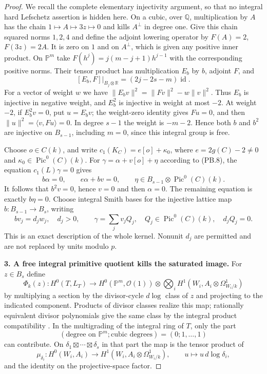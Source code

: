 \begin{proof}
We recall the complete elementary injectivity argument, so that no
integral hard Lefschetz assertion is hidden here. On a cubic, over
$\mathbb Q$, multiplication by $A$ has the chain
$1\mapsto A\mapsto3z\mapsto0$ and kills $A^\perp$ in degree one.
Give this chain squared norms $1,2,4$ and define the adjoint lowering
operator by $F(A)=2$, $F(3z)=2A$. It is zero on $1$ and on $A^\perp$,
which is given any positive inner product. On $\mathbb P^m$ take
$F(h^j)=j(m-j+1)h^{j-1}$ with the corresponding positive norms.
Their tensor product has multiplication $E_b$ by $b$, adjoint $F$,
and
\[
 [E_b,F]|_{B_j\otimes\mathbb R}
       =(2j-2s-m)\operatorname{id}.
\]
For a vector of weight $w$ we have
$\|E_bv\|^2=\|Fv\|^2-w\|v\|^2$.
Thus $E_b$ is injective in negative weight, and $E_b^2$ is injective
in weight at most $-2$. At weight $-2$, if $E_b^2v=0$, put
$u=E_bv$; the weight-zero identity gives $Fu=0$, and then
$\|u\|^2=\langle v,Fu\rangle=0$. In degree $s-1$ the weight is
$-m-2$. Hence both $b$ and $b^2$ are injective on $B_{s-1}$,
including $m=0$, since this integral group is free.

Choose $o\in C(k)$, and write $c_1(K_C)=e[o]+\kappa_0$, where
$e=2g(C)-2\ne0$ and $\kappa_0\in\operatorname{Pic}^0(C)(k)$.
For $\gamma=\alpha+v[o]+\eta$ according to (PB.8), the equation
$c_1(L)\gamma=0$ gives
\[
 b\alpha=0,\qquad e\alpha+bv=0,
 \qquad
 \eta\in B_{s-1}\otimes\operatorname{Pic}^0(C)(k).
\]
It follows that $b^2v=0$, hence $v=0$ and then $\alpha=0$.
The remaining equation is exactly $b\eta=0$.
Choose integral Smith bases for the injective lattice map
$b:B_{s-1}\to B_s$, writing
\[
 bv_j=d_jw_j,\quad d_j>0,
 \qquad
 \gamma=\sum_jv_jQ_j,\quad
 Q_j\in\operatorname{Pic}^0(C)(k),\quad d_jQ_j=0.
 \tag{PB.9}
\]
This is an exact description of the whole kernel. Nonunit $d_j$
are permitted and are not replaced by units modulo $p$.

\textbf{3. A free integral primitive quotient kills the saturated image.}
For $z\in B_s$ define
\[
 \Phi_k(z):H^0(T,L_T)\longrightarrow
 H^0(\mathbb P^m,\mathcal O(1))\otimes
            \bigotimes_i H^1(W_i,A_i\otimes\Omega^1_{W_i/k})
 \tag{PB.10}
\]
by multiplying a section by the divisor-cycle $d\log$ class of $z$
and projecting to the indicated component. Products of divisor
classes realize this map; rationally equivalent divisor polynomials
give the same class by the integral product compatibility
\citep[Section 3, diagram (22), pp.~557--558]{cyBraunling2013}.
In the multigrading of the integral ring of $T$, only the part
\[
       (\text{degree on }\mathbb P^m;\text{cubic degrees})
                         =(0;1,\ldots,1)
 \tag{PB.11}
\]
can contribute. On $\delta_1\boxtimes\cdots\boxtimes\delta_s$
in that part the map is the tensor product of
\[
 \mu_{\delta_i}:H^0(W_i,A_i)\longrightarrow
           H^1(W_i,A_i\otimes\Omega^1_{W_i/k}),
 \qquad u\longmapsto u\,d\log\delta_i,
\]
and the identity on the projective-space factor.


\end{proof}
